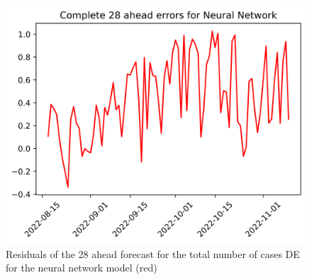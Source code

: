 \begin{figure}
\begin{minipage}{.32\textwidth}
  \label{fig:tot_cases_error_28_nn}
\end{minipage}
\begin{minipage}{.32\textwidth}
  \centering
  \includegraphics[width=\linewidth]{pics/28_ah/DE_28_ahead_errors_Neural Network.png}
  \caption{Residuals of the 28 ahead forecast for the total number of cases DE for the neural network model (red)}
  \label{fig:tot_cases_error_28_nn_DE}
\end{minipage}

\end{figure}
